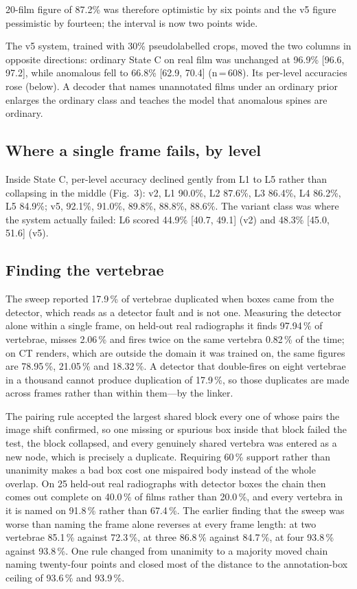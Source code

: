 \documentclass[11pt,letterpaper]{article}
\newcommand{\ci}[2]{[#1, #2]}
\begin{document}
20-film figure of 87.2\% was therefore optimistic by six points and the v5 figure pessimistic by fourteen; the interval is now two points wide.

The v5 system, trained with 30\% pseudolabelled crops, moved the two columns in opposite directions: ordinary State C on real film was unchanged at 96.9\% \ci{96.6}{97.2}, while anomalous fell to 66.8\% \ci{62.9}{70.4} (n\,=\,608). Its per-level accuracies rose (below). A decoder that names unannotated films under an ordinary prior enlarges the ordinary class and teaches the model that anomalous spines are ordinary.

\subsection*{Where a single frame fails, by level}
Inside State C, per-level accuracy declined gently from L1 to L5 rather than collapsing in the middle (Fig.~3): v2, L1 90.0\%, L2 87.6\%, L3 86.4\%, L4 86.2\%, L5 84.9\%; v5, 92.1\%, 91.0\%, 89.8\%, 88.8\%, 88.6\%. The variant class was where the system actually failed: L6 scored 44.9\% \ci{40.7}{49.1} (v2) and 48.3\% \ci{45.0}{51.6} (v5).

\subsection*{Finding the vertebrae}
The sweep reported 17.9\,\% of vertebrae duplicated when boxes came from the detector, which reads as a detector fault and is not one. Measuring the detector alone within a single frame, on held-out real radiographs it finds 97.94\,\% of vertebrae, misses 2.06\,\% and fires twice on the same vertebra 0.82\,\% of the time; on CT renders, which are outside the domain it was trained on, the same figures are 78.95\,\%, 21.05\,\% and 18.32\,\%. A detector that double-fires on eight vertebrae in a thousand cannot produce duplication of 17.9\,\%, so those duplicates are made across frames rather than within them---by the linker.

The pairing rule accepted the largest shared block every one of whose pairs the image shift confirmed, so one missing or spurious box inside that block failed the test, the block collapsed, and every genuinely shared vertebra was entered as a new node, which is precisely a duplicate. Requiring 60\,\% support rather than unanimity makes a bad box cost one mispaired body instead of the whole overlap. On 25 held-out real radiographs with detector boxes the chain then comes out complete on 40.0\,\% of films rather than 20.0\,\%, and every vertebra in it is named on 91.8\,\% rather than 67.4\,\%. The earlier finding that the sweep was worse than naming the frame alone reverses at every frame length: at two vertebrae 85.1\,\% against 72.3\,\%, at three 86.8\,\% against 84.7\,\%, at four 93.8\,\% against 93.8\,\%. One rule changed from unanimity to a majority moved chain naming twenty-four points and closed most of the distance to the annotation-box ceiling of 93.6\,\% and 93.9\,\%.
\end{document}
